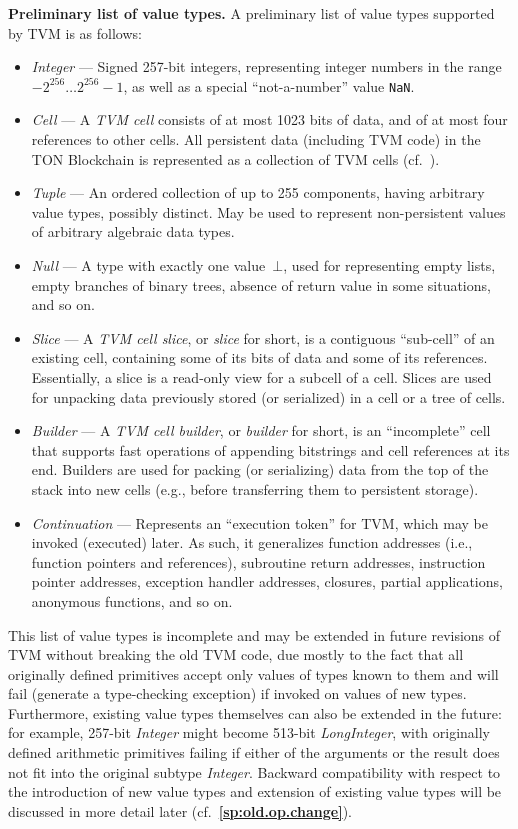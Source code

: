 \documentclass[12pt,oneside]{article}
\def\makepoint#1{\medbreak\noindent{\bf #1.\ }}
\def\nxsubpoint{\refstepcounter{subsubsection}%
    \smallbreak\makepoint{\thesubsubsection}}
\def\refpoint#1{{\rm\textbf{\ref{#1}}}}
\let\ptref=\refpoint
\def\emb#1{\textbf{#1.}}
\begin{document}
    \nxsubpoint\label{sp:val.types}\emb{Preliminary list of value types}
    A preliminary list of value types supported by TVM is as follows:
    \begin{itemize}
        \item {\em Integer\/} --- Signed 257-bit integers, representing integer numbers in the range $-2^{256}\ldots2^{256}-1$, as well as a special ``not-a-number'' value \texttt{NaN}.
        \item {\em Cell\/} --- A {\em TVM cell\/} consists of at most 1023 bits of data, and of at most four references to other cells. All persistent data (including TVM code) in the TON Blockchain is represented as a collection of TVM cells (cf.~\cite[2.5.14]{TON}).
        \item {\em Tuple\/} --- An ordered collection of up to 255 components, having arbitrary value types, possibly distinct. May be used to represent non-persistent values of arbitrary algebraic data types.
        \item {\em Null\/} --- A type with exactly one value~$\bot$, used for representing empty lists, empty branches of binary trees, absence of return value in some situations, and so on.
        \item {\em Slice\/} --- A {\em TVM cell slice}, or {\em slice\/} for short, is a contiguous ``sub-cell'' of an existing cell, containing some of its bits of data and some of its references. Essentially, a slice is a read-only view for a subcell of a cell. Slices are used for unpacking data previously stored (or serialized) in a cell or a tree of cells.
        \item {\em Builder\/} --- A {\em TVM cell builder}, or {\em builder\/} for short, is an ``incomplete'' cell that supports fast operations of appending bitstrings and cell references at its end. Builders are used for packing (or serializing) data from the top of the stack into new cells (e.g., before transferring them to persistent storage).
        \item {\em Continuation\/} --- Represents an ``execution token'' for TVM, which may be invoked (executed) later. As such, it generalizes function addresses (i.e., function pointers and references), subroutine return addresses, instruction pointer addresses, exception handler addresses, closures, partial applications, anonymous functions, and so on.
    \end{itemize}
    This list of value types is incomplete and may be extended in future revisions of TVM without breaking the old TVM code, due mostly to the fact that all originally defined primitives accept only values of types known to them and will fail (generate a type-checking exception) if invoked on values of new types. Furthermore, existing value types themselves can also be extended in the future: for example, 257-bit {\em Integer\/} might become 513-bit {\em LongInteger\/}, with originally defined arithmetic primitives failing if either of the arguments or the result does not fit into the original subtype {\em Integer}. Backward compatibility with respect to the introduction of new value types and extension of existing value types will be discussed in more detail later (cf.~\ptref{sp:old.op.change}).
\end{document}
